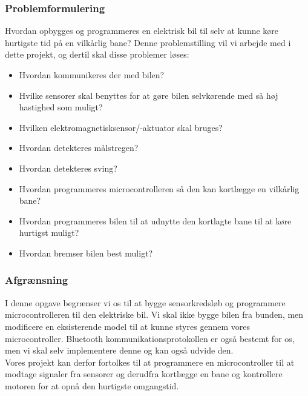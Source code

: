 \subsubsection{Problemformulering}
\label{problemformulering}
Hvordan opbygges og programmeres en elektrisk bil til selv at kunne køre hurtigste tid på en vilkårlig bane? Denne problemstilling vil vi arbejde med i dette projekt, og dertil skal disse problemer løses: \\

\begin{itemize}
\item Hvordan kommunikeres der med bilen?
\item Hvilke sensorer skal benyttes for at gøre bilen selvkørende med så høj hastighed som muligt?
\item Hvilken elektromagnetisksensor/-aktuator skal bruges?
\item Hvordan detekteres målstregen?
\item Hvordan detekteres sving?
\item Hvordan programmeres microcontrolleren så den kan kortlægge en vilkårlig bane?
\item Hvordan programmeres bilen til at udnytte den kortlagte bane til at køre hurtigst muligt?
\item Hvordan bremser bilen best muligt?
\end{itemize}

\newpage
\subsubsection{Afgrænsning}
I denne opgave begrænser vi os til at bygge sensorkredsløb og programmere microcontrolleren til den elektriske bil. Vi skal ikke bygge bilen fra bunden, men modificere en eksisterende model til at kunne styres gennem vores microcontroller. Bluetooth kommunikationsprotokollen er også bestemt for os, men vi skal selv implementere denne og kan også udvide den. \\

Vores projekt kan derfor fortolkes til at programmere en microcontroller til at modtage signaler fra sensorer og derudfra kortlægge en bane og kontrollere motoren for at opnå den hurtigste omgangstid. 


